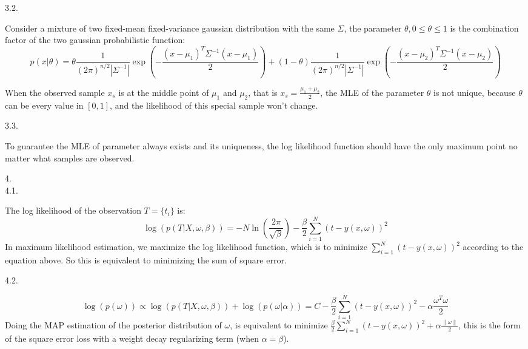\documentclass{article}
\theoremstyle{definition}
\theoremstyle{definition}
\theoremstyle{remark}
\begin{document}
3.2.

\begin{addmargin}[3em]{2em}
  Consider a mixture of two fixed-mean fixed-variance gaussian distribution with the same $\Sigma$, the parameter $\theta, 0 \leq \theta \leq 1$ is the combination factor of the two gaussian probabilistic function:
  \[
  p(x | \theta) = \theta \frac{1}{{(2\pi)}^{n/2}|\Sigma^{-1}|} \exp(-\frac{(x - \mu_1)^T \Sigma^{-1} (x - \mu_1)}{2}) + (1 - \theta) \frac{1}{{(2\pi)}^{n/2}|\Sigma^{-1}|} \exp(-\frac{{(x - \mu_2)}^T \Sigma^{-1} (x - \mu_2)}{2})
  \]

  When the observed sample $x_s$ is at the middle point of $\mu_1$ and $\mu_2$, that is $x_s = \frac{\mu_1 + \mu_2}{2}$, the MLE of the parameter $\theta$ is not unique, because $\theta$ can be every value in $[0, 1]$, and the likelihood of this special sample won't change.

\end{addmargin}

3.3.

\begin{addmargin}[3em]{2em}
  To guarantee the MLE of parameter always exists and its uniqueness, the log likelihood function should have the only maximum point no matter what samples are observed.
\end{addmargin}

4.\\
4.1.
\begin{addmargin}[3em]{2em}
  The log likelihood of the observation $T=\{t_i\}$ is:
  \[
  \log(p(T | X, \omega, \beta)) = -N \ln(\frac{2 \pi}{\sqrt{\beta}}) - \frac{\beta}{2} \sum_{i=1}^N {(t - y(x, \omega))}^2
  \]
  In maximum likelihood estimation, we maximize the log likelihood function, which is to minimize $\sum_{i=1}^N {(t - y(x, \omega))}^2$ according to the equation above. So this is equivalent to minimizing the sum of square error.
\end{addmargin}

4.2.

\begin{addmargin}[3em]{2em}
  \[
  \log(p(\omega)) \propto \log(p(T | X, \omega, \beta)) + \log(p(\omega | \alpha)) = C - \frac{\beta}{2} \sum_{i=1}^N {(t - y(x, \omega))}^2 - \alpha \frac{\omega^T \omega}{2}
  \]
  Doing the MAP estimation of the posterior distribution of $\omega$, is equivalent to minimize $\frac{\beta}{2} \sum_{i=1}^N {(t - y(x, \omega))}^2 + \alpha \frac{\|\omega\|}{2}$, this is the form of the square error loss with a weight decay regularizing term (when $\alpha = \beta$).
\end{addmargin}
\end{document}

